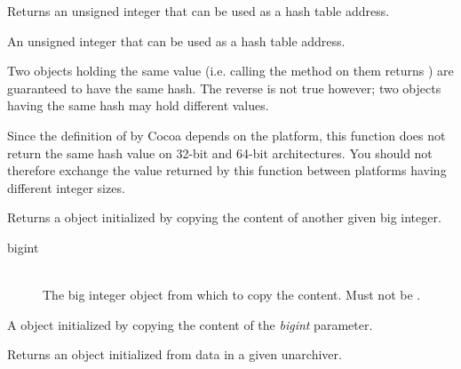 

Returns an unsigned integer that can be used as a hash table address.


\docretval

An unsigned integer that can be used as a hash table address.

\docdiscuss

Two  objects holding the same value (i.e. calling the  method on them returns ) are guaranteed to have the same hash. The reverse is not true however; two  objects having the same hash may hold different values.

Since the definition of  by Cocoa depends on the platform, this function does not return the same hash value on 32-bit and 64-bit architectures. You should not therefore exchange the value returned by this function between platforms having different integer sizes.



Returns a  object initialized by copying the content of another given big integer.


\docparams

\begin{description}
\item[bigint] \hfill \\ The big integer object from which to copy the content. Must not be .
\end{description}

\docretval

A  object initialized by copying the content of the \emph{bigint} parameter.



Returns an object initialized from data in a given unarchiver.


\docparams


